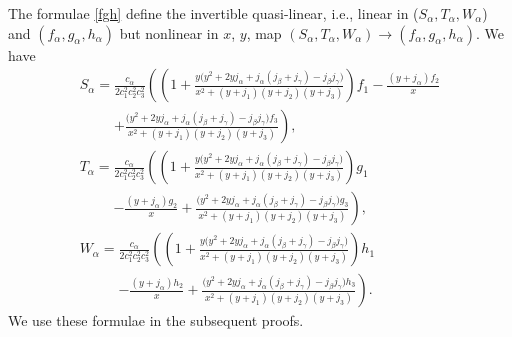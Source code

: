 \documentclass[pdftex]{sigma}
\def\a{\alpha}
\def\b{\beta}
\def\g{\gamma}
\numberwithin{equation}{section}
\begin{document}
The formulae \eqref{fgh} define the invertible quasi-linear, i.e., linear in ($S_{\a}, T_{\a}, W_{\a}$) and $(f_{\a}, g_{\a},\allowbreak h_{\a})$ but nonlinear in $x$, $y$, map $(S_{\a}, T_{\a}, W_{\a}) \rightarrow (f_{\a}, g_{\a}, h_{\a})$. We have
\begin{subequations}\label{STW}
\begin{gather}
 S_{\a}=\frac{c_{\a}}{2 c_1^2c_2^2c_3^2 }\left( \left(1+\frac{y \big(y^2+2 y j_{\a}+j_{\a} (j_{\b}+j_{\g})-j_{\b} j_{\g}\big)}{x^2+(y+j_{1}) (y+j_2) (y+j_3)}\right) f_1-
 \frac{(y+j_{\a}) f_2}{x}\right.\nonumber\\
\phantom{S_{\a}=}{}
\left.+\frac{\big(y^2+2 y j_{\a}+j_{\a} (j_{\b}+j_{\g})-j_{\b} j_{\g}\big) f_3}{x^2+(y+j_1) (y+j_2) (y+j_3)}
 \right),
\\
 T_{\a}= \frac{c_{\a}}{2 c_1^2c_2^2c_3^2 }\left( \left(1+\frac{y \big(y^2+2 y j_{\a}+j_{\a} (j_{\b}+j_{\g})-j_{\b} j_{\g}\big)}{x^2+(y+j_{1}) (y+j_2) (y+j_3)}\right) g_1\right.\nonumber\\
\phantom{T_{\a}= }{}
\left.- \frac{(y+j_{\a}) g_2}{x}+\frac{\big(y^2+2 y j_{\a}+j_{\a} (j_{\b}+j_{\g})-j_{\b} j_{\g}\big) g_3}{x^2+(y+j_1) (y+j_2) (y+j_3)}
 \right),
\\
 W_{\a}=\frac{c_{\a}}{2 c_1^2c_2^2c_3^2 }\left( \left(1+\frac{y \big(y^2+2 y j_{\a}+j_{\a} (j_{\b}+j_{\g})-j_{\b} j_{\g}\big)}{x^2+(y+j_{1}) (y+j_2) (y+j_3)}\right) h_1\right.\nonumber\\
 \phantom{W_{\a}=}{}
 \left.-\frac{(y+j_{\a}) h_2}{x}+\frac{\big(y^2+2 y j_{\a}+j_{\a} (j_{\b}+j_{\g})-j_{\b} j_{\g}\big) h_3}{x^2+(y+j_1) (y+j_2) (y+j_3)}
 \right).
 \end{gather}
\end{subequations}
We use these formulae in the subsequent proofs.
\end{document}
